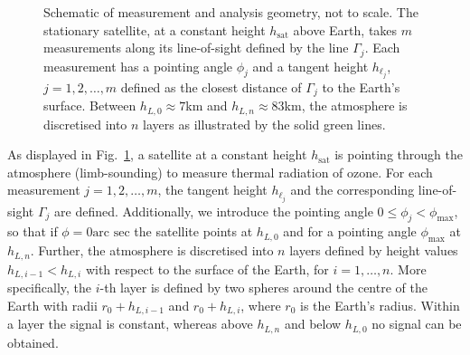 \documentclass{article}
\begin{document}
\begin{figure}[ht!]
	\centering
	
	\caption[Schematic of measurement and analysis geometry.]{Schematic of measurement and analysis geometry, not to scale.
		The stationary satellite, at a constant height $h_\text{sat}$ above Earth, takes $m$ measurements along its line-of-sight defined by the line $\Gamma_j$.
		Each measurement has a pointing angle $\phi_j$ and a tangent height $h_{\ell_j}$, $j=1,2,\dots,m$ defined as the closest distance of $\Gamma_j$ to the Earth's surface.
		Between $h_{L,0} \approx 7$km and $h_{L,n} \approx 83$km, the atmosphere is discretised into $n$ layers as illustrated by the solid green lines.}
	\label{fig:LIMB}
\end{figure}
As displayed in Fig.~\ref{fig:LIMB}, a satellite at a constant height $h_{\text{sat}}$ is pointing through the atmosphere (limb-sounding) to measure thermal radiation of ozone.
For each measurement $j=1,2,\ldots,m$, the tangent height $h_{\ell_j}$ and the corresponding line-of-sight $\Gamma_j$ are defined.
Additionally, we introduce the pointing angle $0 \leq \phi_j < \phi_{\text{max}}$, so that if $\phi = 0 \text{arc sec}$ the satellite points at $h_{L,0}$ and for a pointing angle $\phi_{\text{max}}$ at $h_{L,n}$.
Further, the atmosphere is discretised into $n$ layers defined by height values $h_{L,i-1} < h_{L,i}$ with respect to the surface of the Earth, for $i = 1, \dots, n$.
More specifically, the $i$-th layer is defined by two spheres around the centre of the Earth with radii $ r_0 + h_{L,i-1} $ and $r_0 + h_{L,i}$, where $r_0$ is the Earth's radius.
Within a layer the signal is constant, whereas above $h_{L, n}$ and below $h_{L,0} $ no signal can be obtained.
\end{document}
